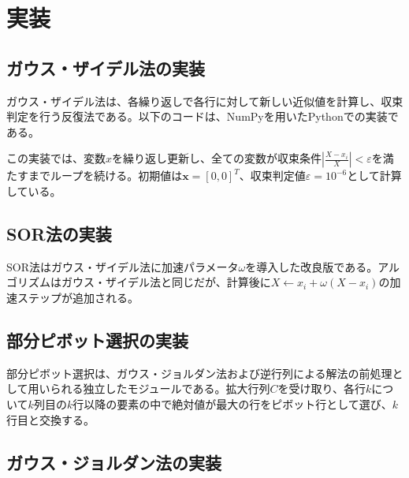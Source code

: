 \documentclass[12pt,a4paper]{ltjsreport}
\begin{document}
\newpage
\section{実装}

\subsection{ガウス・ザイデル法の実装}

ガウス・ザイデル法は、各繰り返しで各行に対して新しい近似値を計算し、収束判定を行う反復法である。以下のコードは、NumPyを用いたPythonでの実装である。



この実装では、変数$x$を繰り返し更新し、全ての変数が収束条件$\left|\frac{X - x_i}{X}\right| < \varepsilon$を満たすまでループを続ける。初期値は$\boldsymbol{x} = [0, 0]^T$、収束判定値$\varepsilon = 10^{-6}$として計算している。

\newpage
\subsection{SOR法の実装}

SOR法はガウス・ザイデル法に加速パラメータ$\omega$を導入した改良版である。アルゴリズムはガウス・ザイデル法と同じだが、計算後に$X \leftarrow x_i + \omega(X - x_i)$の加速ステップが追加される。



\newpage
\subsection{部分ピボット選択の実装}\label{sec:pivot}

部分ピボット選択は、ガウス・ジョルダン法および逆行列による解法の前処理として用いられる独立したモジュールである。拡大行列$C$を受け取り、各行$k$について$k$列目の$k$行以降の要素の中で絶対値が最大の行をピボット行として選び、$k$行目と交換する。



\newpage
\subsection{ガウス・ジョルダン法の実装}
\end{document}
